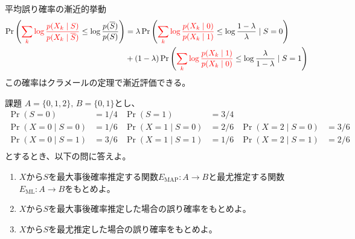 \documentclass[lualatex,handout]{beamer}
\newcommand{\mycolor}[2]{%
  \begingroup
  \colorlet{currentcolor}{.}%
  \color{#1}#2%
  \color{currentcolor}%
  \endgroup
}
\newcommand{\emm}[1]{\mycolor{red}{#1}}
\theoremstyle{definition}
\begin{document}
\begin{frame}{平均誤り確率の漸近的挙動}
\footnotesize
\begin{align*}
\Pr\left(\emm{\sum_k \log\frac{p(X_k\mid S)}{p(X_k\mid \overline{S})}} \le \log\frac{p(\overline{S})}{p(S)}\right)
&=
\lambda \Pr\left(\emm{\sum_k \log\frac{p(X_k\mid 0)}{p(X_k\mid 1)}} \le \log\frac{1-\lambda}{\lambda}\mid S=0\right)\\
&+
(1-\lambda) \Pr\left(\emm{\sum_k \log\frac{p(X_k\mid 1)}{p(X_k\mid 0)}} \le \log\frac{\lambda}{1-\lambda}\mid S=1\right)
\end{align*}
この確率はクラメールの定理で漸近評価できる。


\end{frame}

\begin{frame}{課題}
\small
$A=\{0,1,2\},\,B=\{0, 1\}$とし、
\begin{align*}
\Pr(S = 0) &= 1/4&
\Pr(S = 1) &= 3/4\\
\Pr(X=0\mid S=0) &= 1/6&
\Pr(X=1\mid S=0) &= 2/6&
\Pr(X=2\mid S=0) &= 3/6\\
\Pr(X=0\mid S=1) &= 3/6&
\Pr(X=1\mid S=1) &= 1/6&
\Pr(X=2\mid S=1) &= 2/6\\
\end{align*}
とするとき、以下の問に答えよ。
\vspace{1em}
\begin{enumerate}
\setlength{\itemsep}{1em}
\item $X$から$S$を最大事後確率推定する関数$E_{\mathrm{MAP}}\colon A\to B$と最尤推定する関数$E_{\mathrm{ML}}\colon A\to B$をもとめよ。
\item $X$から$S$を最大事後確率推定した場合の誤り確率をもとめよ。
\item $X$から$S$を最尤推定した場合の誤り確率をもとめよ。
\end{enumerate}
\end{frame}
\end{document}
